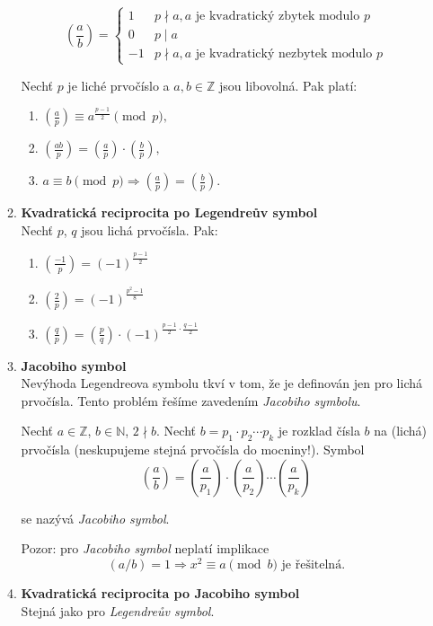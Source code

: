 \documentclass[12pt,a4paper]{article}
\begin{document}
\begin{enumerate}[leftmargin=*]
\begin{enumerate}
			\[ \genfrac(){}{0}{a}{b} = \left\{
				\begin{array}{ll}
					1 & p \nmid a, a \text{ je kvadratický zbytek modulo } p \\
					0 & p \mid a \\
					-1& p \nmid a, a \text{ je kvadratický nezbytek modulo } p
				\end{array}
			\right. \]

			Nechť $p$ je liché prvočíslo a $a, b \in \mathbb{Z}$ jsou libovolná.
			Pak platí:

			\begin{enumerate}
				\item $\genfrac(){}{1}{a}{p} \equiv  a^{\frac{p-1}{2}} \pmod{p},$
				\item $\genfrac(){}{1}{ab}{p} = \genfrac(){}{1}{a}{p} \cdot
					\genfrac(){}{1}{b}{p},$
				\item $a \equiv b \pmod{p} \Rightarrow \genfrac(){}{1}{a}{p}
					= \genfrac(){}{1}{b}{p}.$
			\end{enumerate}

		\item \textbf{Kvadratická reciprocita po Legendreův symbol}\\
			Nechť $p$, $q$ jsou lichá prvočísla. Pak:

			\begin{enumerate}
				\item $\genfrac(){}{1}{-1}{p} = (-1)^{\frac{p-1}{2}}$
				\item $\genfrac(){}{1}{2}{p} = (-1)^{\frac{p^2-1}{8}}$
				\item $\genfrac(){}{1}{q}{p} = \genfrac(){}{1}{p}{q} \cdot
					(-1)^{\frac{p-1}{2} \cdot \frac{q-1}{2}}$
			\end{enumerate}

		\item \textbf{Jacobiho symbol}\\
			Nevýhoda Legendreova symbolu tkví v tom, že je definován jen pro
			lichá prvočísla. Tento problém řešíme zavedením \textit{Jacobiho
			symbolu}.

			Nechť $a \in \mathbb{Z}$, $b \in \mathbb{N}$, $2 \nmid b$. Nechť
			$b = p_1 \cdot p_2 \cdots p_k$ je rozklad čísla $b$ na (lichá)
			prvočísla (neskupujeme stejná prvočísla do mocniny!). Symbol
			\[ \genfrac(){}{0}{a}{b} = \genfrac(){}{0}{a}{p_1} \cdot
				\genfrac(){}{0}{a}{p_2} \cdots \genfrac(){}{0}{a}{p_k} \]

			se nazývá \textit{Jacobiho symbol}.

			Pozor: pro \textit{Jacobiho symbol} neplatí implikace
			\[ (a/b) = 1 \Rightarrow x^2 \equiv a \pmod{b} \text{ je řešitelná.} \]

		\item \textbf{Kvadratická reciprocita po Jacobiho symbol}\\
			Stejná jako pro \textit{Legendreův symbol}.

	\end{enumerate}

\end{enumerate}
\end{document}
